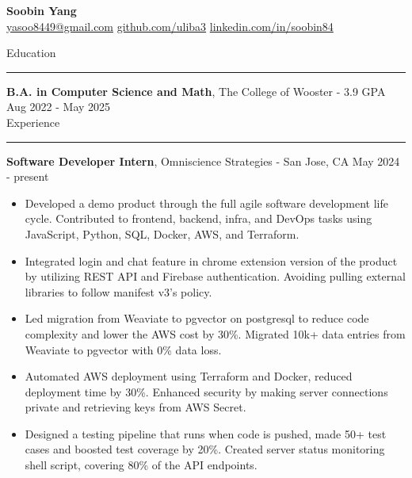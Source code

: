 \documentclass[letterpaper,12pt]{article}
\begin{document}
\linespread{1}\selectfont
{}
\newcommand{\sectionrule}[1]{
  \vspace{5pt}
  \RaggedRight
  {\large\textnormal{#1}}
  \hrule
  \vspace{3pt}
}
\pagestyle{empty}

\begin{center}
    \textbf{\Large Soobin Yang}\\
    \faEnvelope \href{mailto:yasoo8449@gmail.com}{ yasoo8449@gmail.com} \hspace{1pt}
    \faGithubSquare \href{https://github.com/uliba3}{ github.com/uliba3} \hspace{1pt}
    \faLinkedinSquare \href{https://www.linkedin.com/in/soobinyang8449/}{ linkedin.com/in/soobin84}
\end{center}

\vspace{-10pt}

\sectionrule{Education}
\textbf{B.A. in Computer Science and Math}\textnormal{, The College of Wooster - 3.9 GPA} \hfill \textnormal{Aug 2022 - May 2025}\\

\sectionrule{Experience}
\textbf{Software Developer Intern}\textnormal{, Omniscience Strategies - San Jose, CA} \hfill \textnormal{May 2024 - present}\\
\begin{itemize}
    \item Developed a demo product through the full agile software development life cycle. Contributed to frontend, backend, infra, and DevOps tasks using JavaScript, Python, SQL, Docker, AWS, and Terraform.
    \item Integrated login and chat feature in chrome extension version of the product by utilizing REST API and Firebase authentication. Avoiding pulling external libraries to follow manifest v3's policy.
    \item Led migration from Weaviate to pgvector on postgresql to reduce code complexity and lower the AWS cost by 30\%. Migrated 10k+ data entries from Weaviate to pgvector with 0\% data loss.
    \item Automated AWS deployment using Terraform and Docker, reduced deployment time by 30\%. Enhanced security by making server connections private and retrieving keys from AWS Secret.
    \item Designed a testing pipeline that runs when code is pushed, made 50+ test cases and boosted test coverage by 20\%. Created server status monitoring shell script, covering 80\% of the API endpoints.
\end{itemize}
\end{document}

